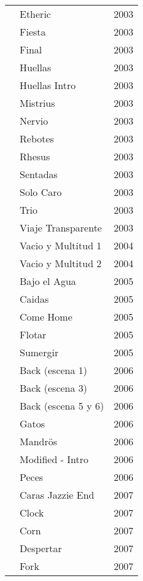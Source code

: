 \begin{center}
\begin{longtable}{ p{}  p{}  p{} }
& Etheric & 2003 \\ \cmidrule (r){2-3} 
& Fiesta & 2003 \\ \cmidrule (r){2-3} 
& Final & 2003 \\ \cmidrule (r){2-3} 
& Huellas & 2003 \\ \cmidrule (r){2-3} 
& Huellas Intro & 2003 \\ \cmidrule (r){2-3} 
& Mistrius & 2003 \\ \cmidrule (r){2-3} 
& Nervio & 2003 \\ \cmidrule (r){2-3} 
& Rebotes & 2003 \\ \cmidrule (r){2-3} 
& Rhesus & 2003 \\ \cmidrule (r){2-3} 
& Sentadas & 2003 \\ \cmidrule (r){2-3} 
& Solo Caro & 2003 \\ \cmidrule (r){2-3} 
& Trio & 2003 \\ \cmidrule (r){2-3} 
& Viaje Transparente & 2003 \\ \cmidrule (r){2-3} 
& Vacio y Multitud 1 & 2004 \\ \cmidrule (r){2-3} 
& Vacio y Multitud 2 & 2004 \\ \cmidrule (r){2-3} 
& Bajo el Agua & 2005 \\ \cmidrule (r){2-3} 
& Caidas & 2005 \\ \cmidrule (r){2-3} 
& Come Home & 2005 \\ \cmidrule (r){2-3} 
& Flotar & 2005 \\ \cmidrule (r){2-3} 
& Sumergir & 2005 \\ \cmidrule (r){2-3} 
& Back (escena 1) & 2006 \\ \cmidrule (r){2-3} 
& Back (escena 3) & 2006 \\ \cmidrule (r){2-3} 
& Back (escena 5 y 6) & 2006 \\ \cmidrule (r){2-3} 
& Gatos & 2006 \\ \cmidrule (r){2-3} 
& Mandrös & 2006 \\ \cmidrule (r){2-3} 
& Modified - Intro & 2006 \\ \cmidrule (r){2-3} 
& Peces & 2006 \\ \cmidrule (r){2-3} 
& Caras Jazzie End & 2007 \\ \cmidrule (r){2-3} 
& Clock & 2007 \\ \cmidrule (r){2-3} 
& Corn & 2007 \\ \cmidrule (r){2-3} 
& Despertar & 2007 \\ \cmidrule (r){2-3} 
& Fork & 2007 \\ \cmidrule (r){2-3} 

\end{longtable}
\end{center}
